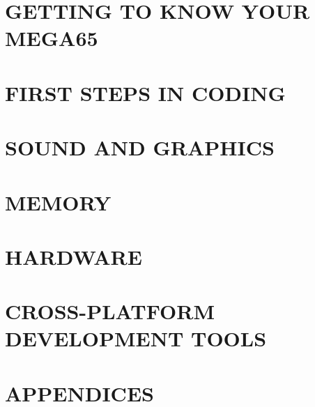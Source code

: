 

\cleardoublepage
{}

\part{GETTING TO KNOW YOUR MEGA65}







\part{FIRST STEPS IN CODING}








\part{SOUND AND GRAPHICS}





\part{MEMORY}



\part{HARDWARE}



\part{CROSS-PLATFORM DEVELOPMENT TOOLS}









\part{APPENDICES}

\appendix

